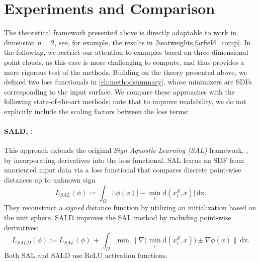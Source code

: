 \documentclass[12pt,openany]{book}
\def\S{\mathcal{S}}
\theoremstyle{plainnormal}
\theoremstyle{remark}
\begin{document}
\section{Experiments and Comparison}\label{Comps}
The theoretical framework presented above is directly adaptable to work in dimension $n=2$, see, for example, the results in \cref{heatweights,farfield_comp}. In the following, we restrict our attention to examples based on three-dimensional point clouds, as this case is more challenging to compute, and thus provides a more rigorous test of the methods. Building on the theory presented above, we defined two loss functionals in \cref{ch:methodsummary}, whose minimizers are SDFs corresponding to the input surface. We compare these approaches with the following state-of-the-art methods; note that to improve readability, we do not explicitly include the scaling factors between the loss terms:
\paragraph{SALD, \cite{SALD}:} This approach extends the original \emph{Sign Agnostic Learning (SAL)} framework, \cite{SAL}, by incorporating derivatives into the loss functional. SAL learns an SDF from unoriented input data via a loss functional that compares discrete point-wise distances up to unknown sign
$$L_{SAL}(\phi) := \int_\Omega\big||\phi(x)| - \min_{i} \mathrm{d}( x_i^\S, x)\big|\,\mathrm{dx}.
$$
They reconstruct a \emph{signed} distance function by utilizing an initialization based on the unit sphere.
SALD improves the SAL method by including point-wise derivatives:
$$L_{SALD}(\phi) := L_{SAL}(\phi)\, +\, \int_\Omega \min \|\nabla\big(\min_{i} \mathrm{d}( x_i^\S, x)\big) \pm \nabla \phi(x)\|  \,\mathrm{dx}.$$
Both SAL and SALD use ReLU activation functions.
\end{document}
